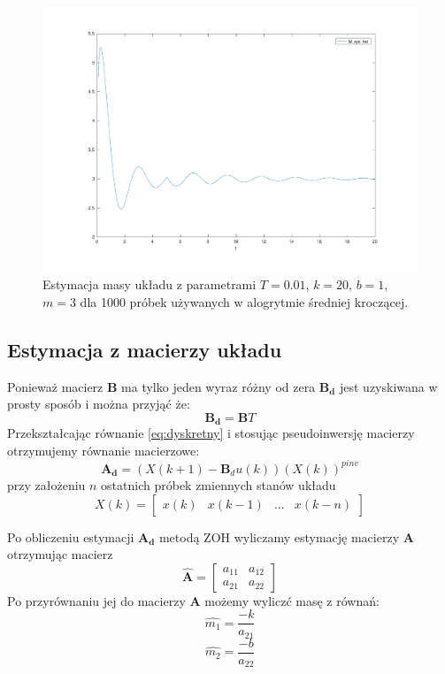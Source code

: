 \documentclass[a4paper]{article}
\begin{document}
\begin{figure}[H]
	\includegraphics[width=0.99\linewidth]{systemfs1000_mass}
	\centering
	\caption{Estymacja masy układu z parametrami $T=0.01$, $k = 20$, $b = 1$, $m = 3$ dla 1000 próbek używanych w alogrytmie średniej kroczącej. }
	\label{fig:systemfs1000_mass}
\end{figure}


\subsection{Estymacja z macierzy układu}
\label{pos}
Ponieważ macierz $\mathbf{B}$ ma tylko jeden wyraz różny od zera $\mathbf{B_d}$ jest uzyskiwana w prosty sposób i można przyjąć że:
\begin{equation}
\mathbf{B_d} = \mathbf{B}T
\end{equation}
Przekształcając równanie \ref{eq:dyskretny} i stosując pseudoinwersję macierzy otrzymujemy równanie macierzowe:
\begin{equation}
	\mathbf{A_d} = (X(k+1) - \mathbf{B}_du(k))(X(k))^{pinv}
	\label{eq:pinv}
\end{equation}
przy założeniu $n$ ostatnich próbek zmiennych stanów układu
\begin{equation}
	X(k) = 	\begin{bmatrix}
		    x(k) & x(k-1)  & ... & x(k-n)
		\end{bmatrix}
	\label{eq:xk}
\end{equation}

Po obliczeniu estymacji $\mathbf{A_d}$ metodą ZOH wyliczamy estymację macierzy $\mathbf{A}$ otrzymując macierz
\begin{equation}
\mathbf{\hat{A}} = 	\begin{bmatrix}
	    a_{11} & a_{12}\\
	    a_{21} & a_{22}
	\end{bmatrix}
\end{equation}
Po przyrównaniu jej do macierzy $\mathbf{A}$ możemy wyliczć masę z równań:
\begin{equation}
\hat{m_1} = \frac{-k}{a_{21}}
\end{equation}
\begin{equation}
\hat{m_2} = \frac{-b}{a_{22}}
\end{equation}
\end{document}
